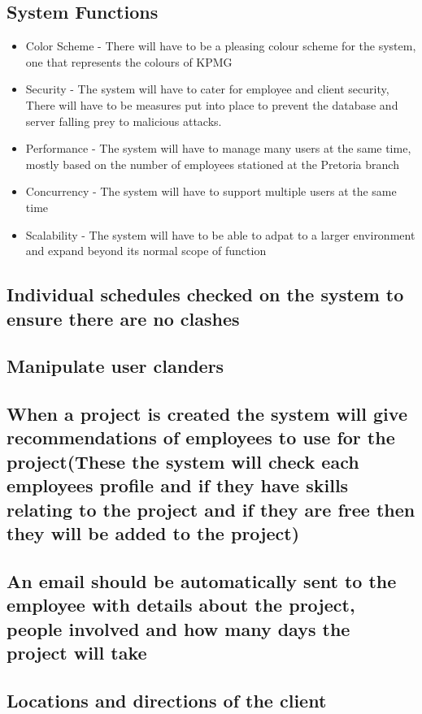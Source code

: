 \documentclass{article}
\begin{document}
	\subsection{System Functions}
		\begin{itemize}
			\item Color Scheme - There will have to be a pleasing colour scheme for the system, one that represents the colours of KPMG
			\item Security - The system will have to cater for employee and client security, There will have to be measures put into place to prevent the database and server falling prey to malicious attacks. 
			\item Performance - The system will have to manage many users at the same time, mostly based on the number of employees stationed at the Pretoria branch
			\item Concurrency - The system will have to support multiple users at the same time
			\item Scalability - The system will have to be able to adpat to a larger environment and expand beyond its normal scope of function
		\end{itemize}
    
	\subsection{Individual schedules checked on the system to ensure there are no clashes}
	\subsection{Manipulate user clanders}
	\subsection{When a project is created the system will give recommendations of employees to use for the project(These the system will check each employees profile and if they have skills relating to the project and if they are free then they will be added to the project)}
	\subsection{An email should be automatically sent to the employee with details about the project, people involved and how many days the project will take}
	\subsection{Locations and directions of the client}
  
\end{document}
